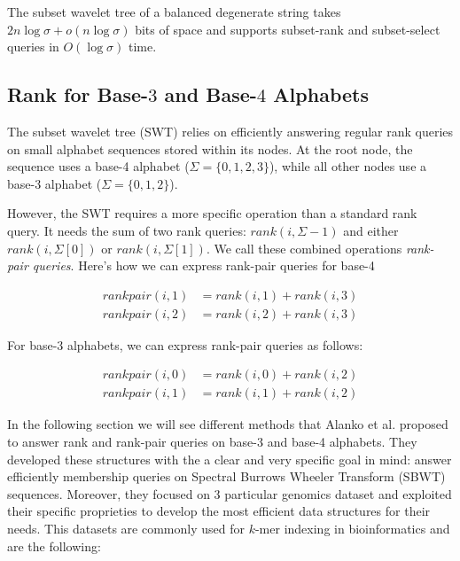 \begin{theorem} \label{thm:swt_space}
    The subset wavelet tree of a balanced degenerate string takes $2n \log \sigma + o(n \log \sigma)$ bits of space and supports subset-rank and subset-select queries in $O(\log \sigma)$ time.
\end{theorem}

\subsection*{Rank for Base-$3$ and Base-$4$ Alphabets}

The subset wavelet tree (SWT) relies on efficiently answering regular rank queries on small alphabet sequences stored within its nodes. At the root node, the sequence uses a base-4 alphabet ($\Sigma = \{0, 1, 2, 3\}$), while all other nodes use a base-3 alphabet ($\Sigma = \{0, 1, 2\}$). \vspace{0.4cm}

\noindent However, the SWT requires a more specific operation than a standard rank query. It needs the sum of two rank queries: $rank(i, \Sigma - 1)$ and either $rank(i, \Sigma[0])$ or $rank(i, \Sigma[1])$. We call these combined operations \emph{rank-pair queries}. Here's how we can express rank-pair queries for base-4

\begin{align}
    rankpair(i,1) & = rank(i,1) + rank(i,3) \\
    rankpair(i,2) & = rank(i,2) + rank(i,3)
\end{align}

\noindent For base-3 alphabets, we can express rank-pair queries as follows:

\begin{align}
    rankpair(i,0) & = rank(i,0) + rank(i,2) \\
    rankpair(i,1) & = rank(i,1) + rank(i,2)
\end{align}

\noindent In the following section we will see different methods that Alanko et al. \cite{SubsetWT} proposed to answer rank and rank-pair queries on base-3 and base-4 alphabets. They developed these structures with the a clear and very specific goal in mind: answer efficiently membership queries on Spectral Burrows Wheeler Transform (SBWT) sequences. Moreover, they focused on 3 particular genomics dataset and exploited their specific proprieties to develop the most efficient data structures for their needs. This datasets are commonly used for $k$-mer indexing in bioinformatics and are the following:

